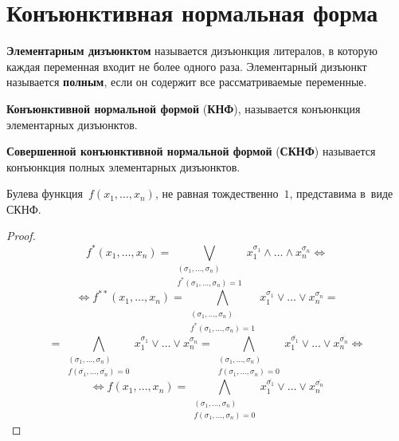 \section{Конъюнктивная нормальная форма}
 \textbf{Элементарным дизъюнктом} называется дизъюнкция литералов, в которую каждая переменная входит не более одного раза.
Элементарный дизъюнкт называется \textbf{полным}, если он содержит все рассматриваемые переменные.

 \textbf{Конъюнктивной нормальной формой} (\textbf{КНФ}), называется конъюнкция элементарных дизъюнктов.

 \textbf{Совершенной конъюнктивной нормальной формой} (\textbf{СКНФ}) называется конъюнкция полных элементарных дизъюнктов.

\begin{statement}
Булева функция~$f(x_1, \ldots, x_n)$, не равная тождественно~$1$, представима в~виде СКНФ.
\end{statement}
\begin{proof}
\begin{equation*}
f^*(x_1, \ldots, x_n) = \bigvee_{\begin{smallmatrix}
(\sigma_1, \ldots, \sigma_n) \\
f^*(\sigma_1, \ldots, \sigma_n) = 1
\end{smallmatrix}} x_1^{\sigma_1} \land \ldots \land x_n^{\sigma_n} \Leftrightarrow
\end{equation*}
\begin{equation*}
\Leftrightarrow f^{**}(x_1, \ldots, x_n) =
\bigwedge_{\begin{smallmatrix}
(\sigma_1, \ldots, \sigma_n) \\
f^*(\sigma_1, \ldots, \sigma_n) = 1
\end{smallmatrix}} x_1^{\sigma_1} \lor \ldots \lor x_n^{\sigma_n} =
\end{equation*}
\begin{equation*}
= \bigwedge_{\begin{smallmatrix}
(\sigma_1, \ldots, \sigma_n) \\
f(\overline{\sigma_1}, \ldots, \overline{\sigma_n}) = 0
\end{smallmatrix}} x_1^{\sigma_1} \lor \ldots \lor x_n^{\sigma_n} =
\bigwedge_{\begin{smallmatrix}
(\sigma_1, \ldots, \sigma_n) \\
f(\sigma_1, \ldots, \sigma_n) = 0
\end{smallmatrix}} x_1^{\overline{\sigma_1}} \lor \ldots \lor x_n^{\overline{\sigma_n}} \Leftrightarrow
\end{equation*}
\begin{equation*}
\Leftrightarrow f(x_1, \ldots, x_n)
= \bigwedge_{\begin{smallmatrix}
(\sigma_1, \ldots, \sigma_n) \\
f(\sigma_1, \ldots, \sigma_n) = 0
\end{smallmatrix}} x_1^{\overline{\sigma_1}} \lor \ldots \lor x_n^{\overline{\sigma_n}}
\end{equation*}
\end{proof}